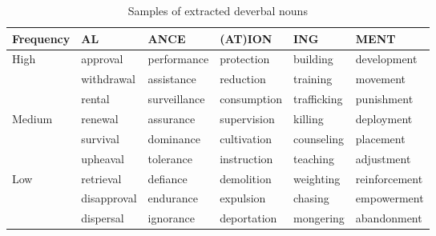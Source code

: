 \documentclass[output=paper]{langsci/langscibook}
\begin{document}
\begin{table}\caption{\label{tab:2:nouns} Samples of extracted deverbal nouns}
{\footnotesize\begin{tabular}{|p{1.3cm}|l|l|l|l|l|}
\hline
 Frequency & AL & ANCE & (AT)ION & ING & MENT \\ \hline
High & approval & performance & protection & building & development \\
& withdrawal & assistance & reduction & training  & movement \\
& rental & surveillance & consumption & trafficking  & punishment \\
\hline
Medium  & renewal & assurance & supervision & killing  & deployment\\
 & survival & dominance & cultivation  & counseling & placement\\
 & upheaval & tolerance & instruction & teaching  & adjustment\\
\hline
Low & retrieval & defiance & demolition & weighting & reinforcement \\
 & disapproval & endurance & expulsion & chasing  & empowerment\\
 & dispersal & ignorance & deportation & mongering & abandonment\\ 
\hline
\end{tabular}}
\end{table}
\end{document}
